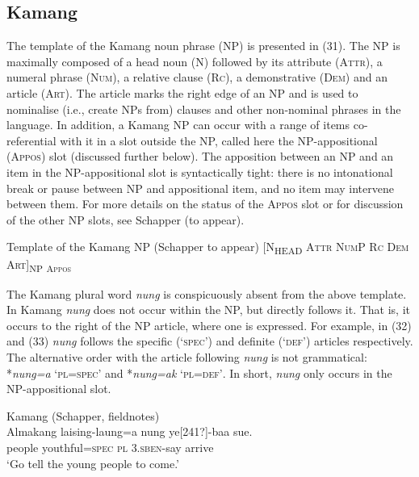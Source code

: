 \subsection{Kamang} %
The template of the Kamang noun phrase (NP) is presented in (31). The NP is maximally composed of a head noun (\textsc{N}) followed by its attribute (\textsc{Attr),} a numeral phrase \textsc{(Num)}, a relative clause (\textsc{Rc}), a demonstrative \textsc{(Dem)} and an article \textsc{(Art)}. The article marks the right edge of an NP and is used to nominalise (i.e., create NPs from) clauses and other non-nominal phrases in the language. In addition, a Kamang NP can occur with a range of items co-referential with it in a slot outside the NP, called here the NP-appositional (\textsc{Appos)} slot (discussed further below). The apposition between an NP and an item in the NP-appositional slot is syntactically tight: there is no intonational break or pause between NP and appositional item, and no item may intervene between them. For more details on the status of the \textsc{Appos} slot or for discussion of the other NP slots, see Schapper (to appear).

\ea%
\label{ex:31} Template of the Kamang NP (Schapper to appear)
 [\textsc{N}\textsc{\textsubscript{HEAD}}\textsc{ Attr  NumP  Rc  Dem  Art]}\textsc{\textsubscript{NP}} \textsc{\textsubscript{Appos}}

\z


The Kamang plural word \textit{nung} is conspicuously absent from the above template. In Kamang \textit{nung} does not occur within the NP, but directly follows it. That is, it occurs to the right of the NP article, where one is expressed. For example, in (32) and (33) \textit{nung} follows the specific (`\textsc{spec}') and definite (`\textsc{def}') articles respectively. The alternative order with the article following \textit{nung} is not grammatical: *\textit{nung=a} `\textsc{pl=spec}' and *\textit{nung=ak} `\textsc{pl=def'}. In short, \textit{nung} only occurs in the NP-appositional slot.


\ea%
\label{ex:32}
Kamang (Schapper, fieldnotes)\\
\gll  Almakang laising-laung=a nung {ye}{[241?]}{-baa} sue. \\
  people youthful=\textsc{spec} \textsc{pl} \textsc{3.sben}-say arrive  \\
\glt `Go tell the young people to come.'
\z







